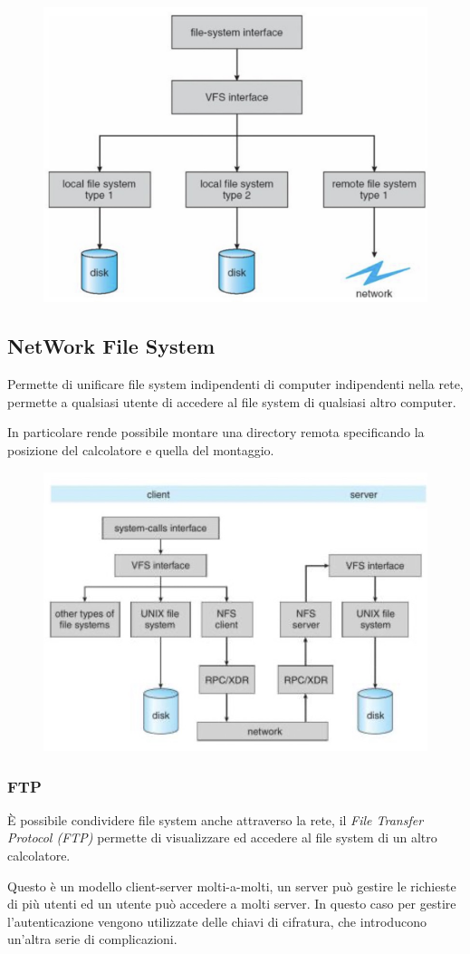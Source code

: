 \begin{figure}[H]
    \centering
    \includegraphics[width=0.5\linewidth]{assets/virtual-file-system.jpeg}
\end{figure}

\subsection{NetWork File System}
Permette di unificare file system indipendenti di computer indipendenti nella rete, permette a qualsiasi utente di accedere al file system di qualsiasi altro computer.

In particolare rende possibile montare una directory remota specificando la posizione del calcolatore e quella del montaggio.

\begin{figure}[H]
    \centering
    \includegraphics[width=0.5\linewidth]{assets/NFS.jpeg}
\end{figure}

\subsubsection{FTP}
È possibile condividere file system anche attraverso la rete, il \textit{File Transfer Protocol (FTP)} permette di visualizzare ed accedere al file system di un altro calcolatore.

Questo è un modello client-server molti-a-molti, un server può gestire le richieste di più utenti ed un utente può accedere a molti server.
In questo caso per gestire l'autenticazione vengono utilizzate delle chiavi di cifratura, che introducono un'altra serie di complicazioni.

